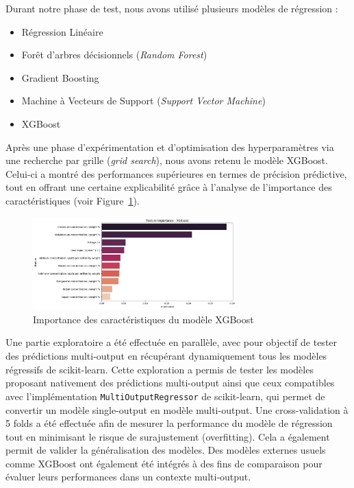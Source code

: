 \documentclass{article}
\begin{document}
Durant notre phase de test, nous avons utilisé plusieurs modèles de régression :

\begin{itemize}
\item Régression Linéaire
\item Forêt d’arbres décisionnels (\textit{Random Forest})
\item Gradient Boosting
\item Machine à Vecteurs de Support (\textit{Support Vector Machine})
\item XGBoost
\end{itemize}

Après une phase d’expérimentation et d’optimisation des hyperparamètres via une recherche par grille (\textit{grid search}), nous avons retenu le modèle XGBoost. Celui-ci a montré des performances supérieures en termes de précision prédictive, tout en offrant une certaine explicabilité grâce à l’analyse de l’importance des caractéristiques (voir Figure~\ref{fig:xgboost_feature_importance}).

\begin{figure}[H]
    \centering
    \includegraphics[width=0.7\textwidth]{images/xgboost_feature_importance.png}
    \caption{Importance des caractéristiques du modèle XGBoost}
    \label{fig:xgboost_feature_importance}
\end{figure}

Une partie exploratoire a été effectuée en parallèle, avec pour objectif de tester des prédictions multi-output en récupérant dynamiquement tous les modèles régressifs de scikit-learn. Cette exploration a permis de tester les modèles proposant nativement des prédictions multi-output ainsi que ceux compatibles avec l’implémentation \texttt{MultiOutputRegressor} de scikit-learn, qui permet de convertir un modèle single-output en modèle multi-output. Une cross-validation à 5 folds a été effectuée afin de mesurer la performance du modèle de régression tout en minimisant le risque de surajustement (overfitting). Cela a également permit de valider la généralisation des modèles. Des modèles externes usuels comme XGBoost ont également été intégrés à des fins de comparaison pour évaluer leurs performances dans un contexte multi-output. 
\end{document}
